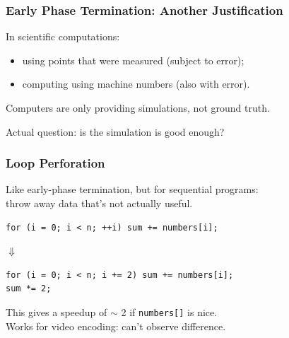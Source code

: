 \begin{frame}
  \frametitle{Early Phase Termination: Another Justification}



In scientific computations:
\begin{itemize}
\item using points that were measured (subject to error);
\item computing using machine numbers (also with error). 
\end{itemize}

Computers are only providing simulations, not ground truth.

Actual question: is the simulation is good enough?

\end{frame}


\begin{frame}[fragile]
  \frametitle{Loop Perforation}


  Like early-phase termination, but for sequential programs:\\
  \qquad throw away data that's not actually useful.

  \begin{lstlisting}
for (i = 0; i < n; ++i) sum += numbers[i];
  \end{lstlisting}

  \begin{center}
    $\Downarrow$
  \end{center}

  \begin{lstlisting}
for (i = 0; i < n; i += 2) sum += numbers[i];
sum *= 2;
  \end{lstlisting}

  This gives a speedup of $\sim$ 2 if {\tt numbers[]} is nice.\\[1em]

  Works for video encoding: can't observe difference.



\end{frame}

